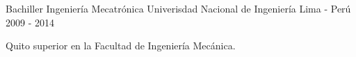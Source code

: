 

\begin{cventries}

  \cventry
    {Bachiller Ingeniería Mecatrónica} %
    {Univerisdad Nacional de Ingeniería} %
    {Lima - Perú} %
    {2009 - 2014} %
    {
      \begin{cvitems} %
        \item {Quito superior en la Facultad de Ingeniería Mecánica.}
      \end{cvitems}
    }

\end{cventries}

